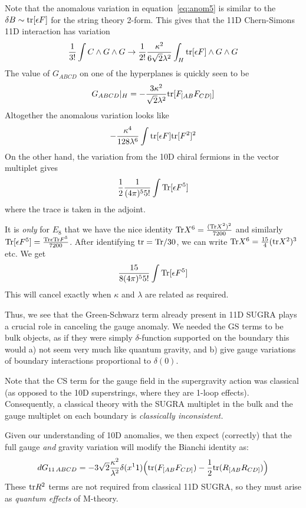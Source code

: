 \documentclass[11pt, class=article, crop=false]{standalone}
\begin{document}
\begin{enumerate}
	 Note that the anomalous variation in equation~\eqref{eq:anom5} is similar to the $\delta B \sim \mathrm{tr} [\epsilon F]$ for the string theory 2-form. This gives that the 11D Chern-Simons 11D interaction has variation 
	 \[
	 	\frac{1}{3!} \int  C \wedge G \wedge G \to \frac{1}{2!} \frac{\kappa^2}{6\sqrt2 \lambda^2}  \int_{H} \mathrm{tr}[\epsilon F] \wedge G \wedge G
	 \]
	 The value of $G_{ABCD}$ on one of the hyperplanes is quickly seen to be 
	 \[
	 	G_{ABCD}|_H = -\frac{3 \kappa^2}{\sqrt{2}\lambda^2} \mathrm{tr}[ F_{[AB} F_{CD]}]
	 \]
	 Altogether the anomalous variation looks like
	 \[
	 	- \frac{\kappa^4}{128 \lambda^6} \int \mathrm{tr}[\epsilon F] \mathrm{tr} [F^2]^2
	 \]
	 On the other hand, the variation from the 10D chiral fermions in the vector multiplet gives
	 \[
	 	\frac12 \frac{1}{(4 \pi)^5 5!} \int \mathrm{Tr} [\epsilon F^5]
	 \]
	 where the trace is taken in the adjoint. 
	 
	 It is \emph{only} for $E_8$ that we have the nice identity $\mathrm{Tr} X^6 = \frac{(\mathrm{Tr} X^2)^2}{7200}$ and similarly $\mathrm{Tr}[\epsilon F^5] = \frac{\mathrm{Tr} \epsilon \mathrm{Tr} F^5}{7200}$. After identifying $\mathrm{tr} = \mathrm{Tr}/30$, we can write $\mathrm{Tr} X^6 = \frac{15}{4} (\mathrm{tr} X^2)^3$ etc. We get
	 \[
	 	\frac{15}{8 (4 \pi)^5 5!} \int \mathrm{Tr} [\epsilon F^5]
	 \]
	 This will cancel exactly when $\kappa$ and $\lambda$ are related as required. 
	 
	 Thus, we see that the Green-Schwarz term already present in 11D SUGRA plays a crucial role in canceling the gauge anomaly. We needed the GS terms to be bulk objects, as if they were simply $\delta$-function supported on the boundary this would a) not seem very much like quantum gravity, and b) give gauge variations of boundary interactions proportional to $\delta(0)$.
	 
	 Note that the CS term for the gauge field in the supergravity action was classical (as opposed to the 10D superstrings, where they are 1-loop effects). Consequently, a classical theory with the SUGRA multiplet in the bulk and the gauge multiplet on each boundary is \emph{classically inconsistent.}
	 
	 Given our understanding of 10D anomalies, we then expect (correctly) that the full gauge \emph{and} gravity variation will modify the Bianchi identity as:
	 \[
	 dG_{11 \, A B C D} = - 3 \sqrt2 \frac{\kappa^2}{\lambda^2} \delta(x^11) \Big(\mathrm{tr} (F_{[AB} F_{CD]}) - \frac12 \mathrm{tr} (R_{[AB} R_{CD]}) \Big)	
	 \]
	These $\mathrm{tr} R^2$ terms are not required from classical 11D SUGRA, so they must arise as \emph{quantum effects} of M-theory.
	 

\end{enumerate}
\end{document}
